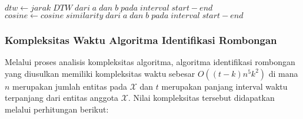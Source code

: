 \begin{algorithm}[H]
{{{{{                        
                        
                    }
                    
                    $dtw \gets jarak\;DTW\;dari\;a\;dan\;b\;pada\;interval\;start-end$ \\
                    $cosine \gets cosine\;similarity\;dari\;a\;dan\;b\;pada\;interval\;start-end$ \\
                    
                }
                
            }
            
        }
    }
\end{algorithm}

\subsubsection{Kompleksitas Waktu Algoritma Identifikasi Rombongan}
\label{subsubsec:time-complexity}

Melalui proses analisis kompleksitas algoritma, algoritma identifikasi rombongan yang diusulkan memiliki kompleksitas waktu sebesar $O((t - k)n^5k^2)$ di mana $n$ merupakan jumlah entitas pada $\mathcal{X}$ dan $t$ merupakan panjang interval waktu terpanjang dari entitas anggota $\mathcal{X}$. Nilai kompleksitas tersebut didapatkan melalui perhitungan berikut:

